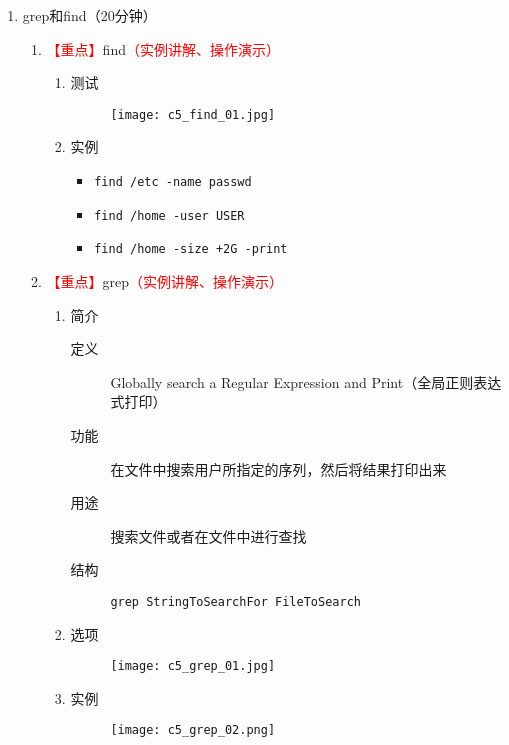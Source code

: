 \documentclass{TIJMUjiaoanLL}
\begin{document}
\begin{enumerate}
\otherTail
\newpage
\otherHeader


  \item grep和find（20分钟）
    \begin{enumerate}
      \item \textcolor{red}{【重点】}find\textcolor{red}{（实例讲解、操作演示）}
	\begin{enumerate}
	  \item 测试
	\vspace*{-10pt}
	\begin{figure}[h]
	  \centering
	  \texttt{[image: c5\_find\_01.jpg]}
	\end{figure}
	\vspace*{-10pt}
	  \item 实例
	    \begin{itemize}
	      \item \verb|find /etc -name passwd|
	      \item \verb|find /home -user USER|
	      \item \verb|find /home -size +2G -print|
	    \end{itemize}
	\end{enumerate}
      \item \textcolor{red}{【重点】}grep\textcolor{red}{（实例讲解、操作演示）}
	\begin{enumerate}
	  \item 简介
	  \begin{description}
	    \item[定义] Globally search a Regular Expression and Print（全局正则表达式打印）
            \item[功能] 在文件中搜索用户所指定的序列，然后将结果打印出来
            \item[用途] 搜索文件或者在文件中进行查找
            \item[结构] \verb|grep StringToSearchFor FileToSearch|
          \end{description}
	  \item 选项
	\vspace*{-10pt}
	\begin{figure}[h]
	  \centering
	  \texttt{[image: c5\_grep\_01.jpg]}
	\end{figure}
	\vspace*{-10pt}
	  \item 实例
	\vspace*{-10pt}
	\begin{figure}[h]
	  \centering
	  \texttt{[image: c5\_grep\_02.png]}
	\end{figure}
	\vspace*{-10pt}
	\end{enumerate}
    \end{enumerate}


\end{enumerate}
\end{document}
